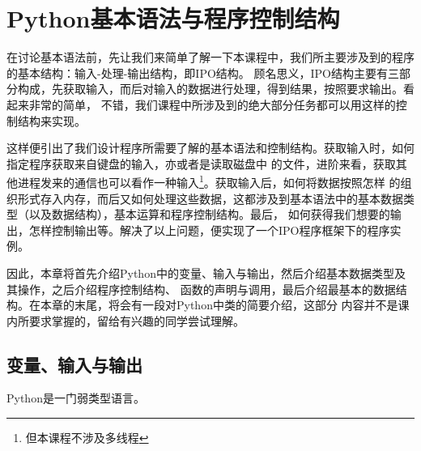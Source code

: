 \chapter{Python基本语法与程序控制结构}
在讨论基本语法前，先让我们来简单了解一下本课程中，我们所主要涉及到的程序的基本结构：输入-处理-输出结构，即IPO结构。
顾名思义，IPO结构主要有三部分构成，先获取输入，而后对输入的数据进行处理，得到结果，按照要求输出。看起来非常的简单，
不错，我们课程中所涉及到的绝大部分任务都可以用这样的控制结构来实现。

这样便引出了我们设计程序所需要了解的基本语法和控制结构。获取输入时，如何指定程序获取来自键盘的输入，亦或者是读取磁盘中
的文件，进阶来看，获取其他进程发来的通信也可以看作一种输入\footnote{但本课程不涉及多线程}。获取输入后，如何将数据按照怎样
的组织形式存入内存，而后又如何处理这些数据，这都涉及到基本语法中的基本数据类型（以及数据结构），基本运算和程序控制结构。最后，
如何获得我们想要的输出，怎样控制输出等。解决了以上问题，便实现了一个IPO程序框架下的程序实例。

因此，本章将首先介绍Python中的变量、输入与输出，然后介绍基本数据类型及其操作，之后介绍程序控制结构、
函数的声明与调用，最后介绍最基本的数据结构。在本章的末尾，将会有一段对Python中类的简要介绍，这部分
内容并不是课内所要求掌握的，留给有兴趣的同学尝试理解。
\section{变量、输入与输出}
Python是一门弱类型语言。